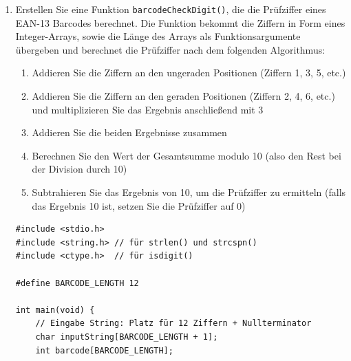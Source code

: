 \begin{enumerate}
\begin{verbatim}
    // (a) Die Funktion convertStringToArray müssen Sie
    //     implementieren
    int convertResult = convertStringToArray(inputString, barcode);

    if (convertResult != 0)
        return 1; // String konnte nicht konvertiert werden

    // Testen der Funktion
    for (int i = 0; i < BARCODE_LENGTH; i++)
        printf("%d ", barcode[i]);
    printf("\n");

    return 0;
}
\end{verbatim}

\begin{mybox}[Bildschirmausgabe]{console}
Ersten 12 Ziffern des EAN-13 Barcodes eingeben:
4 5 9 8 7 6 3 4 2 1 7 8
\end{mybox}



\pagebreak

\item Erstellen Sie eine Funktion \texttt{barcodeCheckDigit()}, die die
Prüfziffer eines EAN-13 Barcodes berechnet. Die Funktion bekommt die Ziffern in
Form eines Integer-Arrays, sowie die Länge des Arrays als Funktionsargumente
übergeben und berechnet die Prüfziffer nach dem folgenden Algorithmus:

\begin{enumerate}[1.]
    \item Addieren Sie die Ziffern an den ungeraden Positionen (Ziffern 1, 3, 5,
    etc.)
    \item Addieren Sie die Ziffern an den geraden Positionen (Ziffern 2, 4, 6,
    etc.) und multiplizieren Sie das Ergebnis anschließend mit 3
    \item Addieren Sie die beiden Ergebnisse zusammen
    \item Berechnen Sie den Wert der Gesamtsumme modulo 10 (also den Rest bei
    der Division durch 10)
    \item Subtrahieren Sie das Ergebnis von 10, um die Prüfziffer zu ermitteln
    (falls das Ergebnis 10 ist, setzen Sie die Prüfziffer auf 0)
\end{enumerate}

\Vorlage
\begin{verbatim}
#include <stdio.h>
#include <string.h> // für strlen() und strcspn()
#include <ctype.h>  // für isdigit()

#define BARCODE_LENGTH 12

int main(void) {
    // Eingabe String: Platz für 12 Ziffern + Nullterminator
    char inputString[BARCODE_LENGTH + 1];
    int barcode[BARCODE_LENGTH];


\end{verbatim}
\end{enumerate}
